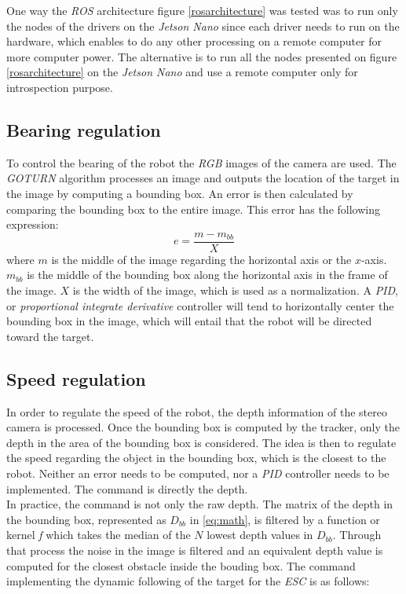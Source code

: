 		\FloatBarrier
		
		One way the \textit{ROS} architecture figure 
		\vref{rosarchitecture} was tested
		was to run only the nodes of the drivers on
		the \textit{Jetson Nano} since each driver needs
		to run on the hardware, which enables to do 
		any other processing on a remote computer
		for more computer power. The alternative is to run 
		all the nodes presented on figure 
		\vref{rosarchitecture} on the \textit{Jetson Nano} and 
		use a remote computer only for
		introspection purpose.
		
		\subsection{Bearing regulation}
			
		To control the bearing of the robot the \textit{RGB} images 
		of the camera are used. The \textit{GOTURN} algorithm 
		processes an image and outputs the location of the 
		target in the image by computing a bounding box. An
		error is then calculated by comparing the bounding box
		to the entire image. This error  has the following expression:
		\begin{equation}
			e = \frac{m - m_{bb}}{X}
		\end{equation}
		where $m$ is the middle of the image regarding the horizontal 
		axis or the $x$-axis. $m_{bb}$ is the middle of the bounding
		box along the horizontal axis in the frame of 
		the image. $X$ is the width of the image, which is used
		as a normalization. A \textit{PID}, or \textit{proportional
		integrate derivative} controller will tend
		to horizontally center the bounding box in the image, which 
		will entail that the robot will be directed toward 
		the target.
		
		\subsection{Speed regulation}
		
		In order to regulate the speed of the robot, the depth 
		information of the stereo camera is processed. Once the 
		bounding box is computed by the tracker, only 
		the depth in the area of the bounding box is considered.
		The idea is then to regulate the speed regarding the object
		in the bounding box, which is the closest to the robot.
		Neither an error needs to be computed, nor a \textit{PID}
		controller 
		needs to be implemented. The command is
		directly the depth.
		\\\indent In practice, the command is not only the raw depth.
		The matrix of the depth in the bounding box, represented 
		as $D_{bb}$ in \eqref{eq:math}, is filtered
		by a function or kernel \textit{f} which takes the median 
		of the $N$ lowest depth values in $D_{bb}$. Through that 
		process the noise in the image is filtered and
		an equivalent depth value is computed for the closest
		obstacle inside the bouding box.
		The command implementing the dynamic following of the target
		for the \textit{ESC} is as follows:
		
